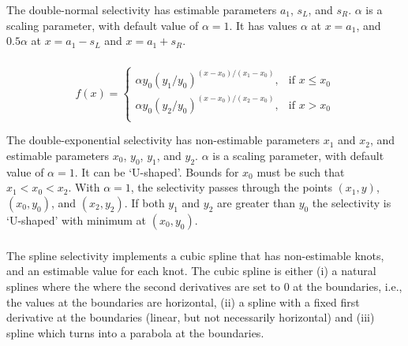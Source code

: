 The double-normal selectivity has estimable parameters $a_1$, $s_L$, and $s_R$. $\alpha$ is a scaling parameter, with default value of $\alpha = 1$. It has values $\alpha$ at $x=a_1$, and $0.5 \alpha$ at $x=a_1-s_L$ and $x=a_1+s_R$. 

\subsubsection[Double-exponential]{}

\begin{equation} 
f(x)=\begin{cases}
	  \alpha y_0(y_1 / y_0)^{(x-x_0)/(x_1-x_0)}, & \text{if $x \le x_0$} \\
	  \alpha y_0(y_2 / y_0)^{(x-x_0)/(x_2-x_0)}, & \text{if $x > x_0$} \\
  \end{cases}
\end{equation}

The double-exponential selectivity has non-estimable parameters $x_1$ and $x_2$, and estimable parameters $x_0$, $y_0$, $y_1$, and $y_2$.  $\alpha$ is a scaling parameter, with default value of $\alpha = 1$. It can be `U-shaped'. Bounds for $x_0$ must be such that $x_1 < x_0 < x_2$. With $\alpha=1$, the selectivity passes through the points $(x_1, y)$, $(x_0, y_0)$, and $(x_2, y_2)$. If both $y_1$ and $y_2$ are greater than $y_0$ the selectivity is `U-shaped' with minimum at $(x_0, y_0)$.

\subsubsection[Spline]{}

The spline selectivity implements a cubic spline that has non-estimable knots, and an estimable value for each knot. The cubic spline is either (i) a natural splines where the where the second derivatives are set to 0 at the boundaries, i.e., the values at the boundaries are horizontal, (ii) a spline with a fixed first derivative at the boundaries (linear, but not necessarily horizontal) and (iii) spline which turns into a parabola at the boundaries.







